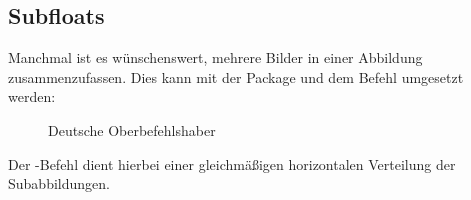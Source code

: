\subsection{Subfloats}
Manchmal ist es wünschenswert, mehrere Bilder in einer Abbildung zusammenzufassen.
Dies kann mit der Package  und dem Befehl  umgesetzt werden:
\begin{latexlisting}
	\begin{figure}
		\hfil
		\caption{Deutsche Oberbefehlshaber}
	\end{figure}
\end{latexlisting}
Der -Befehl dient hierbei einer gleichmäßigen horizontalen Verteilung der Subabbildungen.

